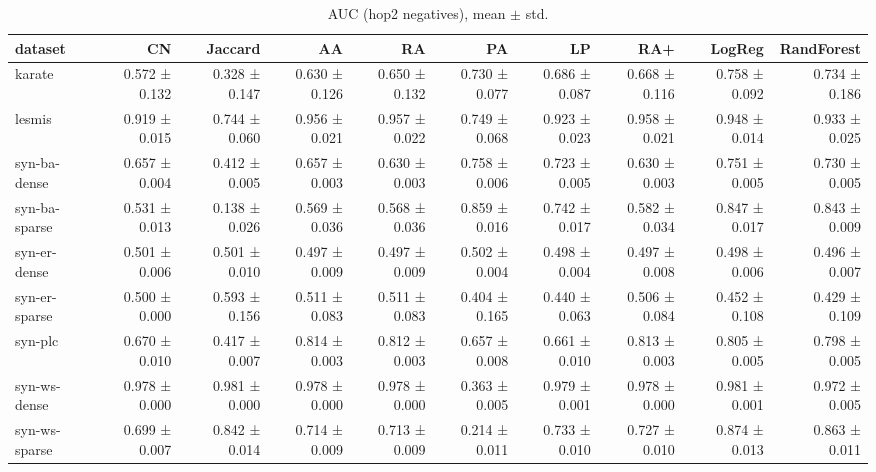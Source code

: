 \begin{table}[t]
\centering
\caption{AUC (hop2 negatives), mean $\pm$ std.}
\label{tab:main_auc_hop2}
\begin{tabular}{lrrrrrrrrr}
\hline
dataset & CN & Jaccard & AA & RA & PA & LP & RA+ & LogReg & RandForest \\
\hline
karate & 0.572 ± 0.132 & 0.328 ± 0.147 & 0.630 ± 0.126 & 0.650 ± 0.132 & 0.730 ± 0.077 & 0.686 ± 0.087 & 0.668 ± 0.116 & 0.758 ± 0.092 & 0.734 ± 0.186 \\
lesmis & 0.919 ± 0.015 & 0.744 ± 0.060 & 0.956 ± 0.021 & 0.957 ± 0.022 & 0.749 ± 0.068 & 0.923 ± 0.023 & 0.958 ± 0.021 & 0.948 ± 0.014 & 0.933 ± 0.025 \\
syn-ba-dense & 0.657 ± 0.004 & 0.412 ± 0.005 & 0.657 ± 0.003 & 0.630 ± 0.003 & 0.758 ± 0.006 & 0.723 ± 0.005 & 0.630 ± 0.003 & 0.751 ± 0.005 & 0.730 ± 0.005 \\
syn-ba-sparse & 0.531 ± 0.013 & 0.138 ± 0.026 & 0.569 ± 0.036 & 0.568 ± 0.036 & 0.859 ± 0.016 & 0.742 ± 0.017 & 0.582 ± 0.034 & 0.847 ± 0.017 & 0.843 ± 0.009 \\
syn-er-dense & 0.501 ± 0.006 & 0.501 ± 0.010 & 0.497 ± 0.009 & 0.497 ± 0.009 & 0.502 ± 0.004 & 0.498 ± 0.004 & 0.497 ± 0.008 & 0.498 ± 0.006 & 0.496 ± 0.007 \\
syn-er-sparse & 0.500 ± 0.000 & 0.593 ± 0.156 & 0.511 ± 0.083 & 0.511 ± 0.083 & 0.404 ± 0.165 & 0.440 ± 0.063 & 0.506 ± 0.084 & 0.452 ± 0.108 & 0.429 ± 0.109 \\
syn-plc & 0.670 ± 0.010 & 0.417 ± 0.007 & 0.814 ± 0.003 & 0.812 ± 0.003 & 0.657 ± 0.008 & 0.661 ± 0.010 & 0.813 ± 0.003 & 0.805 ± 0.005 & 0.798 ± 0.005 \\
syn-ws-dense & 0.978 ± 0.000 & 0.981 ± 0.000 & 0.978 ± 0.000 & 0.978 ± 0.000 & 0.363 ± 0.005 & 0.979 ± 0.001 & 0.978 ± 0.000 & 0.981 ± 0.001 & 0.972 ± 0.005 \\
syn-ws-sparse & 0.699 ± 0.007 & 0.842 ± 0.014 & 0.714 ± 0.009 & 0.713 ± 0.009 & 0.214 ± 0.011 & 0.733 ± 0.010 & 0.727 ± 0.010 & 0.874 ± 0.013 & 0.863 ± 0.011 \\
\hline
\end{tabular}
\end{table}